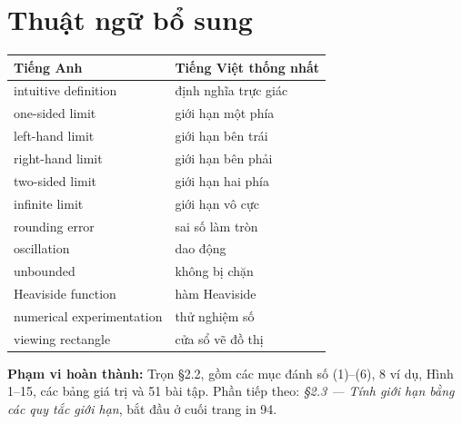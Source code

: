 \documentclass[12pt,a4paper]{article}
\begin{document}
\section*{Thuật ngữ bổ sung}
\begin{center}\begin{tabular}{ll}\toprule Tiếng Anh&Tiếng Việt thống nhất\\\midrule
intuitive definition&định nghĩa trực giác\\
one-sided limit&giới hạn một phía\\
left-hand limit&giới hạn bên trái\\
right-hand limit&giới hạn bên phải\\
two-sided limit&giới hạn hai phía\\
infinite limit&giới hạn vô cực\\
rounding error&sai số làm tròn\\
oscillation&dao động\\
unbounded&không bị chặn\\
Heaviside function&hàm Heaviside\\
numerical experimentation&thử nghiệm số\\
viewing rectangle&cửa sổ vẽ đồ thị\\
\bottomrule\end{tabular}\end{center}
\noindent\textbf{Phạm vi hoàn thành:} Trọn §2.2, gồm các mục đánh số (1)–(6), 8 ví dụ, Hình 1–15, các bảng giá trị và 51 bài tập. Phần tiếp theo: \textit{§2.3 — Tính giới hạn bằng các quy tắc giới hạn}, bắt đầu ở cuối trang in 94.
\end{document}
